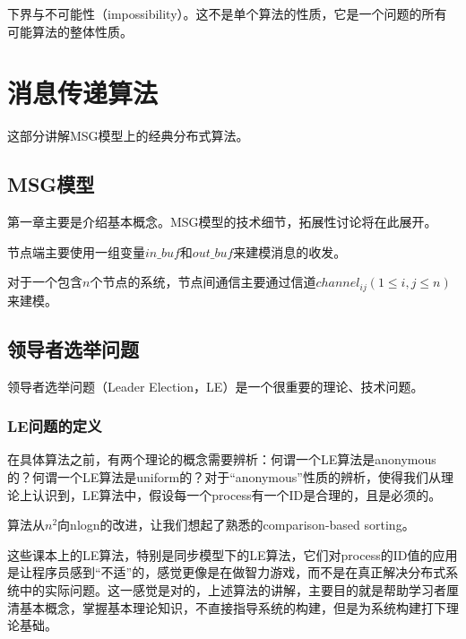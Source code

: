 \documentclass[UTF8]{ctexrep}
\begin{document}
下界与不可能性（impossibility）。这不是单个算法的性质，它是一个问题的所有可能算法的整体性质。


\part{消息传递算法} 

这部分讲解MSG模型上的经典分布式算法。


\chapter{MSG模型} \label{Chap_MSG}

第一章主要是介绍基本概念。MSG模型的技术细节，拓展性讨论将在此展开。

节点端主要使用一组变量$in\_buf$和$out\_buf$来建模消息的收发。

对于一个包含$n$个节点的系统，节点间通信主要通过信道$channel_{ij} (1\leq i, j \leq n)$来建模。



\chapter{领导者选举问题}

领导者选举问题（Leader Election，LE）是一个很重要的理论、技术问题。

\section{LE问题的定义}

在具体算法之前，有两个理论的概念需要辨析：何谓一个LE算法是anonymous的？何谓一个LE算法是uniform的？对于“anonymous”性质的辨析，使得我们从理论上认识到，LE算法中，假设每一个process有一个ID是合理的，且是必须的。

算法从$n^2$向nlogn的改进，让我们想起了熟悉的comparison-based sorting。

这些课本上的LE算法，特别是同步模型下的LE算法，它们对process的ID值的应用是让程序员感到“不适”的，感觉更像是在做智力游戏，而不是在真正解决分布式系统中的实际问题。这一感觉是对的，上述算法的讲解，主要目的就是帮助学习者厘清基本概念，掌握基本理论知识，不直接指导系统的构建，但是为系统构建打下理论基础。
\end{document}
